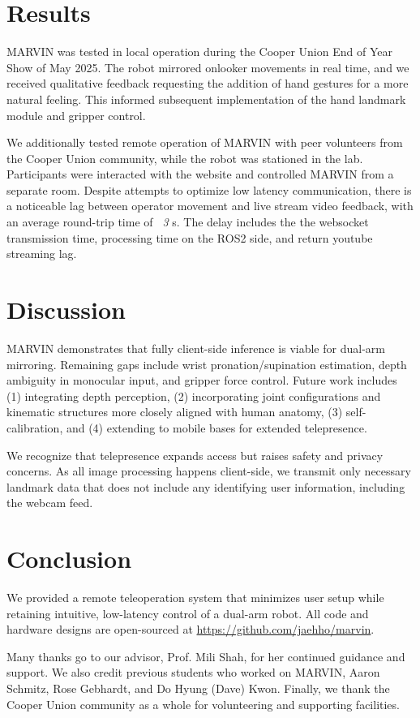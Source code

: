 \documentclass[acmsmall, screen]{acmart}
\begin{document}
\section{Results}
MARVIN was tested in local operation during the Cooper Union End of Year Show of May 2025. The robot mirrored onlooker movements in real time, and we received qualitative feedback requesting the addition of hand gestures for a more natural feeling. This informed subsequent implementation of the hand landmark module and gripper control. 

We additionally tested remote operation of MARVIN with peer volunteers from the Cooper Union community, while the robot was stationed in the lab. Participants were interacted with the website and controlled MARVIN from a separate room. Despite attempts to optimize low latency communication, there is a noticeable lag between operator movement and live stream video feedback, with an average round-trip time of \textit{~3} s. The delay includes the the websocket transmission time, processing time on the ROS2 side, and return youtube streaming lag.

\section{Discussion}
MARVIN demonstrates that fully client-side inference is viable for dual-arm mirroring. Remaining gaps include wrist pronation/supination estimation, depth ambiguity in monocular input, and gripper force control. Future work includes (1) integrating depth perception, (2) incorporating joint configurations and kinematic structures more closely aligned with human anatomy, (3) self-calibration, and (4) extending to mobile bases for extended telepresence.

We recognize that telepresence expands access but raises safety and privacy concerns. As all image processing happens client-side, we transmit only necessary landmark data that does not include any identifying user information, including the webcam feed.

\section{Conclusion}
We provided a remote teleoperation system that minimizes user setup while retaining intuitive, low-latency control of a dual-arm robot. All code and hardware designs are open-sourced at \url{https://github.com/jaehho/marvin}.

\begin{acks}
Many thanks go to our advisor, Prof. Mili Shah, for her continued guidance and support. We also credit previous students who worked on MARVIN, Aaron Schmitz, Rose Gebhardt, and Do Hyung (Dave) Kwon. Finally, we thank the Cooper Union community as a whole for volunteering and supporting facilities.
\end{acks}



\end{document}
